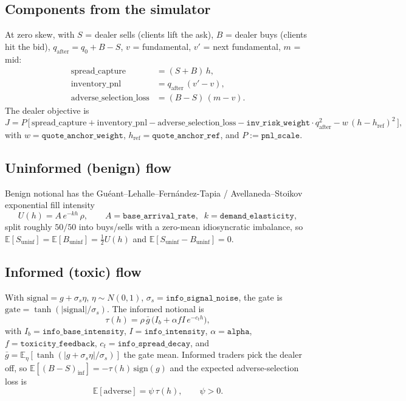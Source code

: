\documentclass[11pt]{article}
\newcommand{\gbar}{\bar g}
\newcommand{\href}{h_{\mathrm{ref}}}
\newcommand{\code}[1]{\texttt{#1}}
\begin{document}
\subsection{Components from the simulator}
At zero skew, with $S$ = dealer sells (clients lift the ask), $B$ = dealer buys
(clients hit the bid), $q_{\mathrm{after}}=q_0+B-S$, $v$ = fundamental,
$v'$ = next fundamental, $m$ = mid:
%
\begin{align*}
  \text{spread\_capture}         &= (S+B)\,h, \\
  \text{inventory\_pnl}          &= q_{\mathrm{after}}\,(v'-v), \\
  \text{adverse\_selection\_loss}&= (B-S)\,(m-v).
\end{align*}
%
The dealer objective is
%
\begin{equation*}
  J = P\,\big[\, \text{spread\_capture} + \text{inventory\_pnl}
      - \text{adverse\_selection\_loss}
      - \code{inv\_risk\_weight}\cdot q_{\mathrm{after}}^2
      - w\,(h-\href)^2 \,\big],
\end{equation*}
%
with $w=\code{quote\_anchor\_weight}$, $\href=\code{quote\_anchor\_ref}$, and
$P:=\code{pnl\_scale}$.

\subsection{Uninformed (benign) flow}
Benign notional has the Gu\'eant--Lehalle--Fern\'andez-Tapia / Avellaneda--Stoikov
exponential fill intensity
%
\begin{equation*}
  U(h) = A\,e^{-kh}\,\rho,\qquad A=\code{base\_arrival\_rate},\;\; k=\code{demand\_elasticity},
\end{equation*}
%
split roughly $50/50$ into buys/sells with a zero-mean idiosyncratic imbalance,
so $\mathbb{E}[S_{\mathrm{uninf}}]=\mathbb{E}[B_{\mathrm{uninf}}]=\tfrac12 U(h)$
and $\mathbb{E}[S_{\mathrm{uninf}}-B_{\mathrm{uninf}}]=0$.

\subsection{Informed (toxic) flow}
With $\mathrm{signal}=g+\sigma_s\eta$, $\eta\sim N(0,1)$,
$\sigma_s=\code{info\_signal\_noise}$, the gate is
$\mathrm{gate}=\tanh(|\mathrm{signal}|/\sigma_s)$. The informed notional is
%
\begin{equation*}
  \tau(h) = \rho\,\gbar\,\big(I_b + \alpha f I\,e^{-c_t h}\big),
\end{equation*}
%
with $I_b=\code{info\_base\_intensity}$, $I=\code{info\_intensity}$,
$\alpha=\code{alpha}$, $f=\code{toxicity\_feedback}$,
$c_t=\code{info\_spread\_decay}$, and
$\gbar=\mathbb{E}_\eta[\tanh(|g+\sigma_s\eta|/\sigma_s)]$ the gate mean. Informed
traders pick the dealer off, so $\mathbb{E}[(B-S)_{\mathrm{inf}}]=-\tau(h)\,\mathrm{sign}(g)$
and the expected adverse-selection loss is
%
\begin{equation*}
  \mathbb{E}[\text{adverse}] = \psi\,\tau(h),\qquad \psi>0.
\end{equation*}
\end{document}
